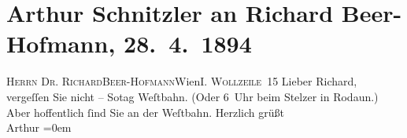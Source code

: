 

         
         \renewcommand{\erwaehntePersonen}{Personen: Richard Beer-Hofmann}
         \renewcommand{\erwaehnteInstitutionen}{Institutionen: Westbahnstrecke}
         \renewcommand{\erwaehnteOrte}{Orte: Gasthaus Stelzer, I., Innere Stadt, IX., Alsergrund, Rodaun, Wien, Wollzeile}
         \renewcommand{\erwaehnteWerke}{}
               \section[Arthur Schnitzler an Richard Beer-Hofmann, 28. 4. 1894]{ Arthur Schnitzler an Richard Beer-Hofmann,
               28. 4. 1894}\nopagebreak{}\rehead{ }\begin{ledgroupsized}[t]{13cm}\normalsize\beginnumbering \toendnotes[C]{\smallbreak\pagebreak[2]} 
\toendnotes[C]{\smallbreak}\pstart{}{\pb}\textsc{Herrn Dr.
                     Richard}\pend{}\pstart{}\textsc{Beer-Hofmann}\pend{}\pstart{}Wien\pend{}\pstart{}\textsc{I.
                        Wollzeile 15}\pend{}{\bigskip}\pstart
           \noindent{}{\pb}Lieber Richard, vergeſſen Sie
               nicht – So{\geminationn}tag{ }\label{K_L00316_1v}\label{K_L00316_1h}{ }Weſtbahn.\pend
           \pstart
           (Oder 6 Uhr beim Stelzer in
               Rodaun.)\pend
           \pstart
           Aber hoffentlich ſind Sie an der Weſtbahn.\pend
           \pstart
           Herzlich grüßt{\\[\baselineskip]}\spacefill\mbox{Arthur}\pend
           \leftskip=0em{}
         
         \endnumbering{}\end{ledgroupsized}  \newcommand{\dateiname}{L00316}\newcommand{\titel}{Arthur Schnitzler an Richard Beer-Hofmann, 28. 4. 1894}\newcommand{\editorInnen}{Martin Anton Müller und Gerd-Hermann Susen}
      
